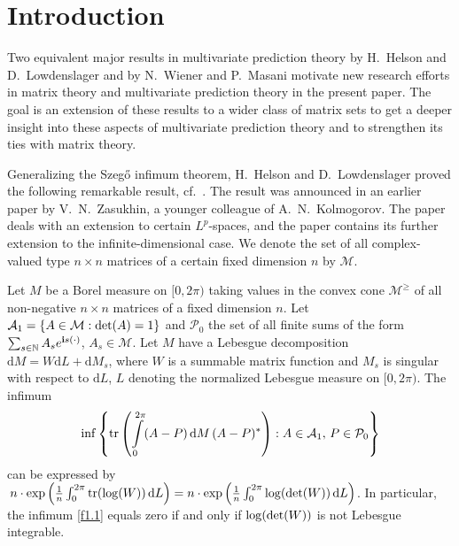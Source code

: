 \documentclass{amsart}
\begin{document}
\maketitle
\section{Introduction}
\label{s1}

Two equivalent major results in multivariate prediction theory by H.~Helson and D.~Lowdenslager  \cite{HL} and by N.~Wiener and P.~Masani \cite{WM} motivate new research efforts in matrix theory and multivariate prediction theory in the present paper. The goal is an extension of these results to a wider class of matrix sets to get a deeper insight into these aspects of multivariate prediction theory and to strengthen its ties with matrix theory. 

Generalizing the Szeg{\H{o}} infimum theorem, H.~Helson and D.~Lowdenslager proved the following remarkable result, cf.~\cite[Thm.~8]{HL}. The result was announced in an earlier paper \cite{Z} by V.~N.~Zasukhin, a younger colleague of A.~N.~Kolmogorov. The paper \cite{K} deals with an extension to certain $L^p$-spaces, and the paper \cite{Cheng} contains its further extension to the infinite-dimensional case. We denote the set of all complex-valued type $n \times n$ matrices of a certain fixed dimension $n$ by $\mathcal M$. 

\begin{thm} {\rm \cite[Thm.~8, Lemma 4 and 5]{HL}} \label{t1.1} \newline
    Let $M$ be a Borel measure on $[0,2 \pi)$ taking values in the convex cone  ${\mathcal M}^\geq$  of all non-negative $n \times n$ matrices of a fixed dimension $n$. Let ${\mathcal A}_1 = \{ A \in {\mathcal M}: {\rm det} (A)=1 \}$ and ${\mathcal P}_0$ the set of all finite sums of the form $\sum_{s \in {\mathbb N}} A_s e^{{\bf i}s ( \cdot )}$, $A_s \in {\mathcal M}$. Let $M$ have a Lebesgue decomposition ${\mathrm d} M  = W {\mathrm d}L + {\mathrm d} M_s$, where $W$ is a summable matrix function and $M_s$ is singular with respect to ${\mathrm d} L$, $L$ denoting the normalized Lebesgue measure on $[0,2 \pi)$. The infimum
    \begin{equation}  \label{f1.1}
         \inf \left\{ {\rm tr} \left( \int\limits_{0}^{2 \pi} (A-P) \, {\mathrm d}M \, (A-P)^* \right): A \in {\mathcal A}_1 , \, P \in {\mathcal P}_0 \right\}
    \end{equation}
can be expressed by $\, n \cdot {\rm exp}  \left( \frac{1}{n} \int_0^{2\pi} {\rm tr} ({\rm log} (W)) \, {\mathrm d} L \right) =  n \cdot {\rm exp} \left( \frac{1}{n} \int_{0}^{2 \pi}  {\rm log} ({\rm det} (W)) \, {\mathrm d} L \right)$. In particular, the infimum \eqref{f1.1} equals zero if and only if ${\rm log}({\rm det}(W))$ is not Lebesgue integrable.
\end{thm}
\end{document}
